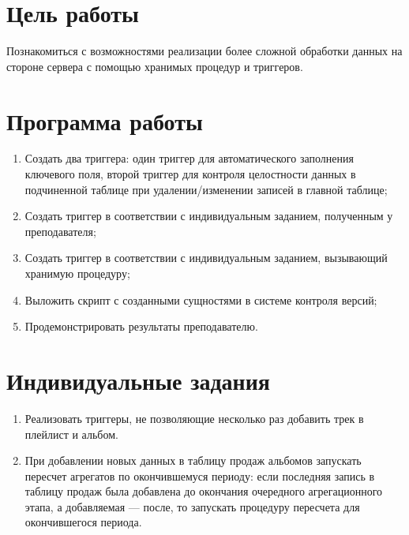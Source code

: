 \section{Цель работы}

Познакомиться с возможностями реализации более сложной обработки данных на стороне сервера с помощью хранимых процедур и триггеров.

\section{Программа работы}

\begin{enumerate}
	\item Создать два триггера: один триггер для автоматического заполнения ключевого поля, второй триггер для контроля целостности данных в подчиненной таблице при удалении/изменении записей в главной таблице;
	\item Создать триггер в соответствии с индивидуальным заданием, полученным у преподавателя;
	\item Создать триггер в соответствии с индивидуальным заданием, вызывающий хранимую процедуру;
	\item Выложить скрипт с созданными сущностями в системе контроля версий;
	\item Продемонстрировать результаты преподавателю.
\end{enumerate}

\section{Индивидуальные задания}

\begin{enumerate}
	\item Реализовать триггеры, не позволяющие несколько раз добавить трек в плейлист и альбом.
	\item При добавлении новых данных в таблицу продаж альбомов запускать пересчет агрегатов по окончившемуся периоду: если последняя запись в таблицу продаж была добавлена до окончания очередного агрегационного этапа, а добавляемая --- после, то запускать процедуру пересчета для окончившегося периода.
\end{enumerate}